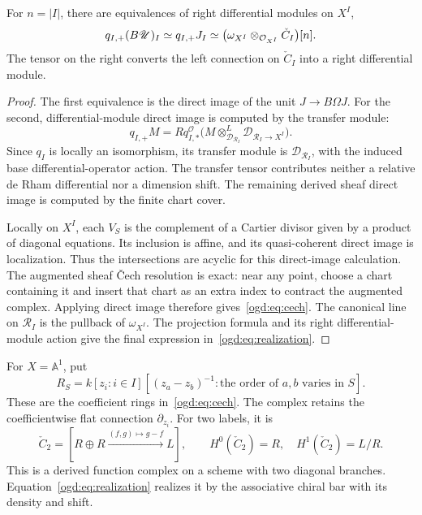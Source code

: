 \begin{proposition}\label{ogd:prop:directimage}
For \(n=|I|\), there are equivalences of right differential modules on \(X^I\),
\begin{equation}\label{ogd:eq:realization}
 q_{I,+}(B\mathscr U)_I\simeq q_{I,+}J_I
 \simeq\bigl(\omega_{X^I}\otimes_{\mathcal O_{X^I}} \check C_I\bigr)[n].
\end{equation}
The tensor on the right converts the left connection on \(\check C_I\) into a right differential module.
\end{proposition}
\begin{proof}
The first equivalence is the direct image of the unit \(J\to B\Omega J\).
For the second, differential-module direct image is computed by the transfer module:
\[
 q_{I,+}M=Rq_{I,*}^{\mathcal O}
  \bigl(M\otimes^L_{\mathcal D_{\mathscr R_I}}
                    \mathcal D_{\mathscr R_I\to X^I}\bigr).
\]
Since \(q_I\) is locally an isomorphism, its transfer module is \(\mathcal D_{\mathscr R_I}\), with the induced base differential-operator action.
The transfer tensor contributes neither a relative de Rham differential nor a dimension shift.
The remaining derived sheaf direct image is computed by the finite chart cover.

Locally on \(X^I\), each \(V_S\) is the complement of a Cartier divisor given by a product of diagonal equations.
Its inclusion is affine, and its quasi-coherent direct image is localization.
Thus the intersections are acyclic for this direct-image calculation.
The augmented sheaf \v{C}ech resolution is exact: near any point, choose a chart containing it and insert that chart as an extra index to contract the augmented complex.
Applying direct image therefore gives~\eqref{ogd:eq:cech}.
The canonical line on \(\mathscr R_I\) is the pullback of \(\omega_{X^I}\).
The projection formula and its right differential-module action give the final expression in~\eqref{ogd:eq:realization}.
\end{proof}

For\label{ogd:def:chart-intersection-coordinate-rings} \(X=\mathbb A^1\), put
\[
 R_S=k[z_i:i\in I]
 [(z_a-z_b)^{-1}:\text{the order of }a,b\text{ varies in }S].
\]
These are the coefficient rings in~\eqref{ogd:eq:cech}.
The complex retains the coefficientwise flat connection \(\partial_{z_i}\).
For two labels, it is
\[
 \check C_2=[R\oplus R\xrightarrow{(f,g)\mapsto g-f}L],
 \qquad H^0(\check C_2)=R,\quad H^1(\check C_2)=L/R.
\]
This is a derived function complex on a scheme with two diagonal branches.
Equation~\eqref{ogd:eq:realization} realizes it by the associative chiral bar with its density and shift.

